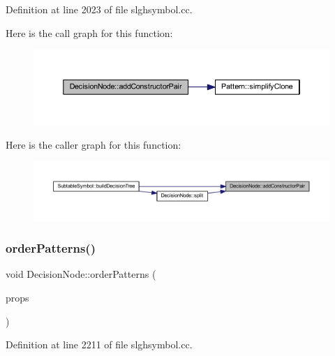 Definition at line 2023 of file slghsymbol.\+cc.

Here is the call graph for this function\+:
\nopagebreak
\begin{figure}[H]
\begin{center}
\leavevmode
\includegraphics[width=350pt]{class_decision_node_a4bd3c547bf2c93c4b8fcde113bb52884_cgraph}
\end{center}
\end{figure}
Here is the caller graph for this function\+:
\nopagebreak
\begin{figure}[H]
\begin{center}
\leavevmode
\includegraphics[width=350pt]{class_decision_node_a4bd3c547bf2c93c4b8fcde113bb52884_icgraph}
\end{center}
\end{figure}
\mbox{\label{class_decision_node_aa1e03428a03681b6a89d812ec4f7346d}} 
\subsubsection{\texorpdfstring{orderPatterns()}{orderPatterns()}}
{\footnotesize\ttfamily void Decision\+Node\+::order\+Patterns (\begin{DoxyParamCaption}\item[{\mbox{\hyperlink{class_decision_properties}{Decision\+Properties}} \&}]{props }\end{DoxyParamCaption})}



Definition at line 2211 of file slghsymbol.\+cc.

